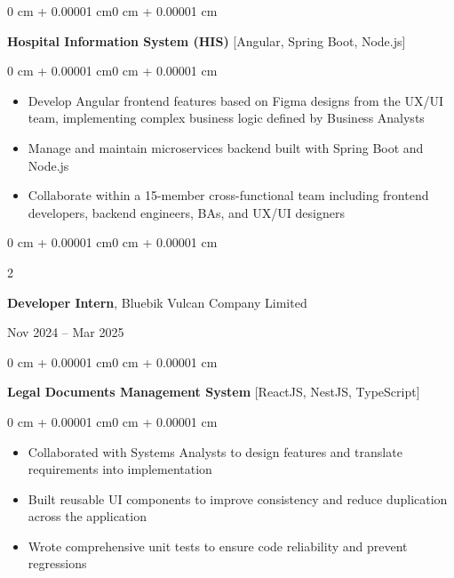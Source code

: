 \documentclass[10pt, letterpaper]{article}
\newenvironment{highlights}{
    \begin{itemize}[
        topsep=0.06 cm,
        parsep=0.06 cm,
        partopsep=0pt,
        itemsep=0pt,
        leftmargin=0.4 cm + 10pt
    ]
}{
    \end{itemize}
}
\newenvironment{onecolentry}{
    \begin{adjustwidth}{0 cm + 0.00001 cm}{0 cm + 0.00001 cm}
}{
    \end{adjustwidth}
}
\newenvironment{twocolentry}[2][]{
    \onecolentry
    \def\secondColumn{#2}
    \setcolumnwidth{\fill, 4.5 cm}
    \begin{paracol}{2}
}{
    \switchcolumn \raggedleft \secondColumn
    \end{paracol}
    \endonecolentry
}
\begin{document}
        \vspace{0.22 cm}
        \begin{onecolentry}
            \textbf{Hospital Information System (HIS)} [Angular, Spring Boot, Node.js]
        \end{onecolentry}

        \vspace{0.10 cm}
        \begin{onecolentry}
            \begin{highlights}
                \item Develop Angular frontend features based on Figma designs from the UX/UI team, implementing complex business logic defined by Business Analysts
                \item Manage and maintain microservices backend built with Spring Boot and Node.js
                \item Collaborate within a 15-member cross-functional team including frontend developers, backend engineers, BAs, and UX/UI designers
            \end{highlights}
        \end{onecolentry}

        \vspace{0.36 cm}

        \begin{twocolentry}{
            Nov 2024 -- Mar 2025
        }
            \large\textbf{Developer Intern}, Bluebik Vulcan Company Limited
        \end{twocolentry}

        \vspace{0.10 cm}
        \begin{onecolentry}
            \textbf{Legal Documents Management System} [ReactJS, NestJS, TypeScript]
        \end{onecolentry}

        \vspace{0.10 cm}
        \begin{onecolentry}
            \begin{highlights}
                \item Collaborated with Systems Analysts to design features and translate requirements into implementation
                \item Built reusable UI components to improve consistency and reduce duplication across the application
                \item Wrote comprehensive unit tests to ensure code reliability and prevent regressions
            \end{highlights}
        \end{onecolentry}
\end{document}
